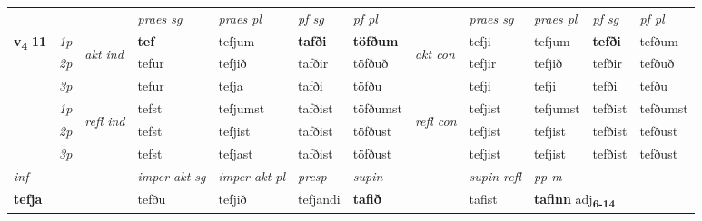 \begin{longtable}[l]{X>{\footnotesize\itshape}llXXXXlXXXX}
 & &   & \textit{praes sg}  & \textit{praes pl}    & \textit{ pf sg} & \textit{pf pl} & & \textit{praes sg}  & \textit{praes pl}    & \textit{pf sg} & \textit{pf pl }  \\ \cmidrule{4-7} \cmidrule{9-12}
 \multirow{2}{*}{{{\textbf{v{\textsubscript{4}}} \Large{\textbf{11}}}}}  & 1p & \multirow{3}{*}{\begin{turn}{90}\textit{akt ind}\end{turn}} & \textbf{tef} & tefjum & \textbf{tafði} & \textbf{töfðum} & \multirow{3}{*}{\begin{turn}{90}\textit{akt con}\end{turn}} &tefji & tefjum & \textbf{tefði} & tefðum\\*
 & 2p &  &  tefur  & tefjið & tafðir & töfðuð & & tefjir & tefjið & tefðir & tefðuð \\*
 & 3p &  & tefur & tefja & tafði & töfðu & & tefji & tefji& tefði & tefðu \\*
\cmidrule{4-7} \cmidrule{9-12}
 & 1p & \multirow{3}{*}{\begin{turn}{90}\textit{refl ind}\end{turn}}  & tefst & tefjumst & tafðist & töfðumst & \multirow{3}{*}{\begin{turn}{90}\textit{refl con}\end{turn}}  &tefjist & tefjumst & tefðist & tefðumst \\*
 & 2p &  & tefst & tefjist & tafðist & töfðust & &tefjist & tefjist & tefðist & tefðust \\*
 & 3p  & & tefst & tefjast & tafðist & töfðust & & tefjist & tefjist& tefðist & tefðust \\*
\cmidrule{4-7} \cmidrule{9-12}

   {\textit{inf}} & &  & \textit{imper akt sg} & \textit{imper akt pl}   & \textit{presp} & \textit{supin} && \textit{supin refl} & \textit{pp m} \\*
  {\textbf{tefja}} & && tefðu  & tefjið   & tefjandi &  \textbf{tafið} && tafist & \multicolumn{2}{l}{\textbf{tafinn} adj\textbf{\textsubscript{6-14}}} \\*


\end{longtable}
